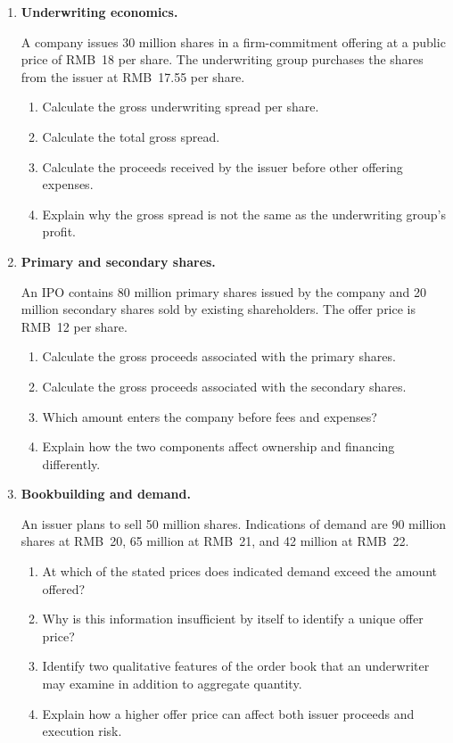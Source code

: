 \begin{enumerate}

\item \textbf{Underwriting economics.}

A company issues 30 million shares in a firm-commitment offering at a public price of RMB~18 per share. The underwriting group purchases the shares from the issuer at RMB~17.55 per share.

\begin{enumerate}
\item Calculate the gross underwriting spread per share.
\item Calculate the total gross spread.
\item Calculate the proceeds received by the issuer before other offering expenses.
\item Explain why the gross spread is not the same as the underwriting group's profit.
\end{enumerate}

\item \textbf{Primary and secondary shares.}

An IPO contains 80 million primary shares issued by the company and 20 million secondary shares sold by existing shareholders. The offer price is RMB~12 per share.

\begin{enumerate}
\item Calculate the gross proceeds associated with the primary shares.
\item Calculate the gross proceeds associated with the secondary shares.
\item Which amount enters the company before fees and expenses?
\item Explain how the two components affect ownership and financing differently.
\end{enumerate}

\item \textbf{Bookbuilding and demand.}

An issuer plans to sell 50 million shares. Indications of demand are 90 million shares at RMB~20, 65 million at RMB~21, and 42 million at RMB~22.

\begin{enumerate}
\item At which of the stated prices does indicated demand exceed the amount offered?
\item Why is this information insufficient by itself to identify a unique offer price?
\item Identify two qualitative features of the order book that an underwriter may examine in addition to aggregate quantity.
\item Explain how a higher offer price can affect both issuer proceeds and execution risk.
\end{enumerate}


\end{enumerate}
